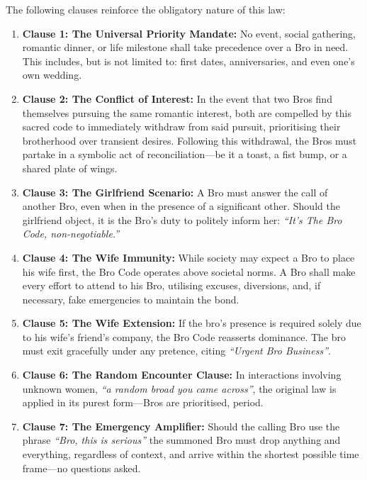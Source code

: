 The following clauses reinforce the obligatory nature of this law:
\begin{enumerate}
    \item \textbf{Clause 1: The Universal Priority Mandate:}  
    No event, social gathering, romantic dinner, or life milestone shall take precedence over a Bro in need. This includes, but is not limited to: first dates, anniversaries, and even one’s own wedding.

    \item \textbf{Clause 2: The Conflict of Interest:}
    In the event that two Bros find themselves pursuing the same romantic interest, both are compelled by this sacred code to immediately withdraw from said pursuit, prioritising their brotherhood over transient desires. Following this withdrawal, the Bros must partake in a symbolic act of reconciliation—be it a toast, a fist bump, or a shared plate of wings.

    \item \textbf{Clause 3: The Girlfriend Scenario:}  
    A Bro must answer the call of another Bro, even when in the presence of a significant other. Should the girlfriend object, it is the Bro’s duty to politely inform her: \textit{“It’s The Bro Code, non-negotiable.”}

    \item \textbf{Clause 4: The Wife Immunity:}  
    While society may expect a Bro to place his wife first, the Bro Code operates above societal norms. A Bro shall make every effort to attend to his Bro, utilising excuses, diversions, and, if necessary, fake emergencies to maintain the bond.

    \item \textbf{Clause 5: The Wife Extension:}  
    If the bro’s presence is required solely due to his wife’s friend’s company, the Bro Code reasserts dominance. The bro must exit gracefully under any pretence, citing \textit{“Urgent Bro Business”}.

    \item \textbf{Clause 6: The Random Encounter Clause:}  
    In interactions involving unknown women, \textit{“a random broad you came across”}, the original law is applied in its purest form—Bros are prioritised, period.

    \item \textbf{Clause 7: The Emergency Amplifier:}  
    Should the calling Bro use the phrase \textit{“Bro, this is serious”} the summoned Bro must drop anything and everything, regardless of context, and arrive within the shortest possible time frame—no questions asked.
\end{enumerate}
\vspace{25pt}

